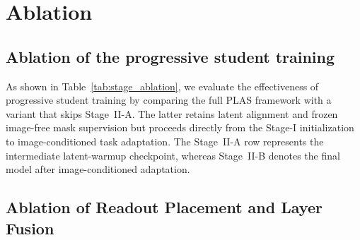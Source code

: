 \section{Ablation}
\subsection{Ablation of the progressive student training}
\label{sec:stage_ablation}

As shown in Table~\ref{tab:stage_ablation}, we evaluate the effectiveness of progressive
student training by comparing the full PLAS
framework with a variant that skips Stage~II-A.
The latter retains latent alignment and frozen
image-free mask supervision but proceeds directly
from the Stage-I initialization to image-conditioned
task adaptation. The Stage~II-A row represents
the intermediate latent-warmup checkpoint,
whereas Stage~II-B denotes the final model
after image-conditioned adaptation.

\begin{table}[t]
  \centering
  \scriptsize
  \setlength{\tabcolsep}{2.0pt}
  \renewcommand{\arraystretch}{0.96}
  \caption{Ablation of progressive student training. Results are cIoU (\%). The Stage~II-A row is the latent-warmup checkpoint trained with latent alignment and image-free-head BCE/Dice losses, and evaluated through the deployment SAM path. All configurations are trained for the same number of epochs.}
  \label{tab:stage_ablation}
\end{table}

\subsection{Ablation of Readout Placement and Layer Fusion}
\label{sec:readout_ablation}

